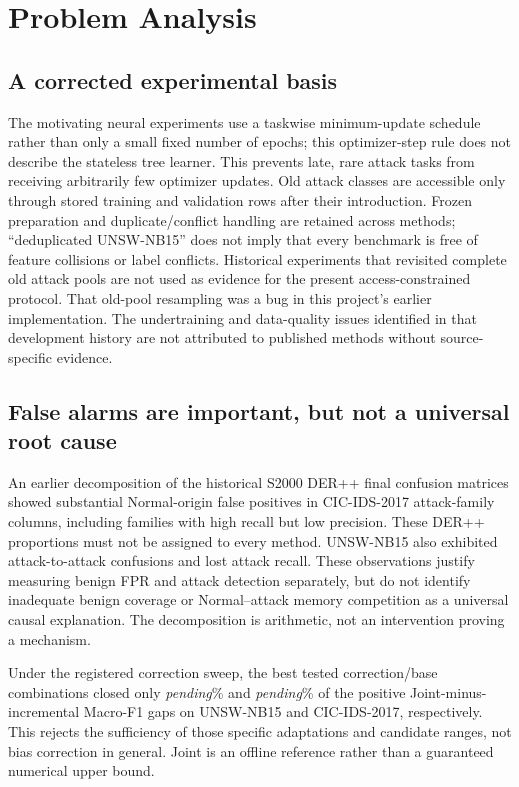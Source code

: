 \documentclass[10pt,twocolumn]{article}
\newcommand{\pending}{\textit{pending}}
\providecommand{\BiasClosureUNSW}{\pending}
\providecommand{\BiasClosureCIC}{\pending}
\begin{document}
\section{Problem Analysis}
\subsection{A corrected experimental basis}
The motivating neural experiments use a taskwise minimum-update schedule rather than only a small fixed number of epochs; this optimizer-step rule does not describe the stateless tree learner. This prevents late, rare attack tasks from receiving arbitrarily few optimizer updates. Old attack classes are accessible only through stored training and validation rows after their introduction. Frozen preparation and duplicate/conflict handling are retained across methods; ``deduplicated UNSW-NB15'' does not imply that every benchmark is free of feature collisions or label conflicts. Historical experiments that revisited complete old attack pools are not used as evidence for the present access-constrained protocol. That old-pool resampling was a bug in this project's earlier implementation. The undertraining and data-quality issues identified in that development history are not attributed to published methods without source-specific evidence.

\subsection{False alarms are important, but not a universal root cause}
An earlier decomposition of the historical S2000 DER++ final confusion matrices showed substantial Normal-origin false positives in CIC-IDS-2017 attack-family columns, including families with high recall but low precision. These DER++ proportions must not be assigned to every method. UNSW-NB15 also exhibited attack-to-attack confusions and lost attack recall. These observations justify measuring benign FPR and attack detection separately, but do not identify inadequate benign coverage or Normal--attack memory competition as a universal causal explanation. The decomposition is arithmetic, not an intervention proving a mechanism.

Under the registered correction sweep, the best tested correction/base combinations closed only \BiasClosureUNSW\% and \BiasClosureCIC\% of the positive Joint-minus-incremental Macro-F1 gaps on UNSW-NB15 and CIC-IDS-2017, respectively. This rejects the sufficiency of those specific adaptations and candidate ranges, not bias correction in general. Joint is an offline reference rather than a guaranteed numerical upper bound.
\end{document}
